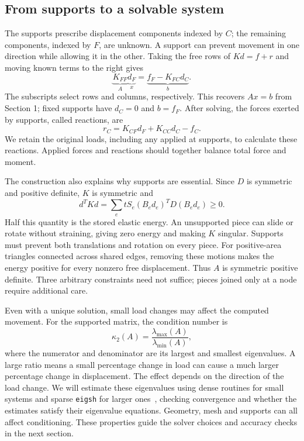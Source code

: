 \subsection{From supports to a solvable system}
The supports prescribe displacement components indexed by $C$; the
remaining components, indexed by $F$, are unknown. A support can prevent
movement in one direction while allowing it in the other. Taking the
free rows of $Kd=f+r$ and moving known terms to the right gives
\begin{equation}
 \underbrace{K_{FF}}_A\underbrace{d_F}_x
 =\underbrace{f_F-K_{FC}d_C}_b.
 \label{eq:mechanics-reduction}
\end{equation}
The subscripts select rows and columns, respectively. This recovers
$Ax=b$ from Section 1; fixed supports have $d_C=0$ and $b=f_F$.
After solving, the forces exerted by supports, called reactions, are
\begin{equation}
 r_C=K_{CF}d_F+K_{CC}d_C-f_C.
 \label{eq:mechanics-reactions}
\end{equation}
We retain the original loads, including any applied at supports, to
calculate these reactions. Applied forces and reactions should together
balance total force and moment.

The construction also explains why supports are essential. Since $D$
is symmetric and positive definite, $K$ is symmetric and
\begin{equation}
 d^TKd=\sum_e tS_e(B_ed_e)^TD(B_ed_e)\geq0.
 \label{eq:mechanics-energy}
\end{equation}
Half this quantity is the stored elastic energy. An unsupported piece
can slide or rotate without straining, giving zero energy and making
$K$ singular. Supports must prevent both translations and rotation on
every piece. For positive-area triangles connected across shared edges,
removing these motions makes the energy positive for every nonzero free
displacement. Thus $A$ is symmetric positive definite. Three arbitrary
constraints need not suffice; pieces joined only at a node require
additional care.

Even with a unique solution, small load changes may affect the computed
movement. For the supported matrix, the condition number is
\begin{equation}
 \kappa_2(A)=\frac{\lambda_{\max}(A)}{\lambda_{\min}(A)},
 \label{eq:mechanics-conditioning}
\end{equation}
where the numerator and denominator are its largest and smallest
eigenvalues. A large ratio means a small percentage change in load can cause a much
larger percentage change in displacement. The effect depends on the
direction of the load change. We will estimate these eigenvalues using
dense routines for small systems and sparse \texttt{eigsh} for larger
ones~\cite{scipy-eigsh}, checking convergence and whether the estimates
satisfy their eigenvalue equations. Geometry, mesh and supports can all affect
conditioning. These properties guide the solver choices and accuracy
checks in the next section.
